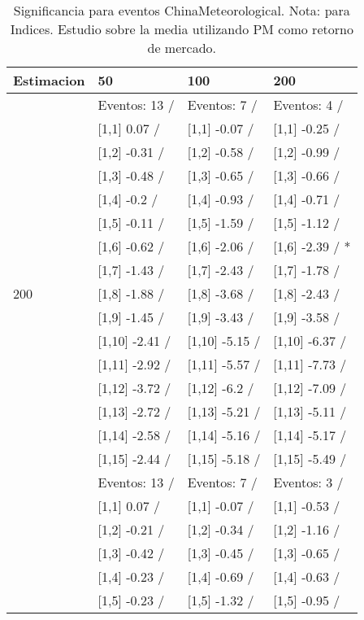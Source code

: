 \begin{table}

\caption{Significancia para eventos ChinaMeteorological. Nota: para Indices. Estudio sobre la media utilizando PM como retorno de mercado.}
\centering
\begin{tabular}[t]{llll}
\toprule
Estimacion & 50 & 100 & 200\\
\midrule
 & Eventos:  13 / & Eventos:  7 / & Eventos:  4 /\\
 & {}[1,1] 0.07  / & {}[1,1] -0.07  / & {}[1,1] -0.25  /\\
 & {}[1,2] -0.31  / & {}[1,2] -0.58  / & {}[1,2] -0.99  /\\
 & {}[1,3] -0.48  / & {}[1,3] -0.65  / & {}[1,3] -0.66  /\\
 & {}[1,4] -0.2  / & {}[1,4] -0.93  / & {}[1,4] -0.71  /\\
\addlinespace
 & {}[1,5] -0.11  / & {}[1,5] -1.59  / & {}[1,5] -1.12  /\\
 & {}[1,6] -0.62  / & {}[1,6] -2.06  / & {}[1,6] -2.39  / *\\
 & {}[1,7] -1.43  / & {}[1,7] -2.43  / & {}[1,7] -1.78  /\\
200 & {}[1,8] -1.88  / & {}[1,8] -3.68  / & {}[1,8] -2.43  /\\
 & {}[1,9] -1.45  / & {}[1,9] -3.43  / & {}[1,9] -3.58  /\\
\addlinespace
 & {}[1,10] -2.41  / & {}[1,10] -5.15  / & {}[1,10] -6.37  /\\
 & {}[1,11] -2.92  / & {}[1,11] -5.57  / & {}[1,11] -7.73  /\\
 & {}[1,12] -3.72  / & {}[1,12] -6.2  / & {}[1,12] -7.09  /\\
 & {}[1,13] -2.72  / & {}[1,13] -5.21  / & {}[1,13] -5.11  /\\
 & {}[1,14] -2.58  / & {}[1,14] -5.16  / & {}[1,14] -5.17  /\\
\addlinespace
 & {}[1,15] -2.44  / & {}[1,15] -5.18  / & {}[1,15] -5.49  /\\
 & Eventos:  13 / & Eventos:  7 / & Eventos:  3 /\\
 & {}[1,1] 0.07  / & {}[1,1] -0.07  / & {}[1,1] -0.53  /\\
 & {}[1,2] -0.21  / & {}[1,2] -0.34  / & {}[1,2] -1.16  /\\
 & {}[1,3] -0.42  / & {}[1,3] -0.45  / & {}[1,3] -0.65  /\\
\addlinespace
 & {}[1,4] -0.23  / & {}[1,4] -0.69  / & {}[1,4] -0.63  /\\
 & {}[1,5] -0.23  / & {}[1,5] -1.32  / & {}[1,5] -0.95  /\\

\end{tabular}
\end{table}

